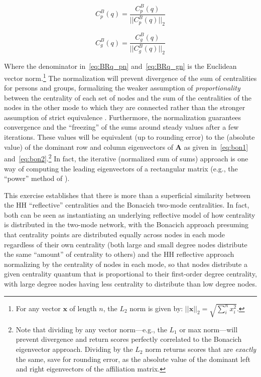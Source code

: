 \documentclass[a4paper,fleqn]{cas-sc}
\begin{document}
\begin{equation}
   C^B_p(q) = \frac{C^B_p(q)}{||C^B_p(q)||_2}
   \label{eq:BRq_pn}
\end{equation} 

\begin{equation}
   C^B_g(q) = \frac{C^B_g(q)}{||C^B_g(q)||_2}
   \label{eq:BRq_gn}
\end{equation} 

Where the denominator in~\ref{eq:BRq_pn} and~\ref{eq:BRq_gn} is the Euclidean vector norm.\footnote{For any vector $\mathbf{x}$ of length $n$, the $L_2$ norm is given by: $||\mathbf{x}||_2 = \sqrt{\sum_i^n x_i^2}$.} The normalization will prevent divergence of the sum of centralities for persons and groups, formalizing the weaker assumption of \textit{proportionality} between the centrality of each set of nodes and the sum of the centralities of the nodes in the other mode to which they are connected rather than the stronger assumption of strict equivalence \citep{bonacich_lloyd01}. Furthermore, the normalization guarantees convergence and the ``freezing'' of the sums around steady values after a few iterations. These values will be equivalent (up to rounding error) to the (absolute value) of the dominant row and column eigenvectors of $\mathbf{A}$ as given in~\ref{eq:bon1} and~\ref{eq:bon2}.\footnote{Note that dividing by any vector norm---e.g., the $L_1$ or max norm---will prevent divergence and return scores perfectly correlated to the Bonacich eigenvector approach. Dividing by the $L_2$ norm returns scores that are \textit{exactly} the same, save for rounding error, as the absolute value of the dominant left and right eigenvectors of the affiliation matrix.} In fact, the iterative (normalized sum of sums) approach is one way of computing the leading eigenvectors of a rectangular matrix (e.g., the ``power'' method of \citet{mises1929praktische}). 

This exercise establishes that there is more than a superficial similarity between the HH ``reflective'' centralities and the Bonacich two-mode centralities. In fact, both can be seen as instantiating an underlying reflective model of how centrality is distributed in the two-mode network, with the Bonacich approach presuming that centrality points are distributed equally across nodes in each mode regardless of their own centrality (both large and small degree nodes distribute the same ``amount'' of centrality to others) and the HH reflective approach normalizing by the centrality of nodes in each mode, so that nodes distribute a given centrality quantum that is proportional to their first-order degree centrality, with large degree nodes having less centrality to distribute than low degree nodes. 
\end{document}
